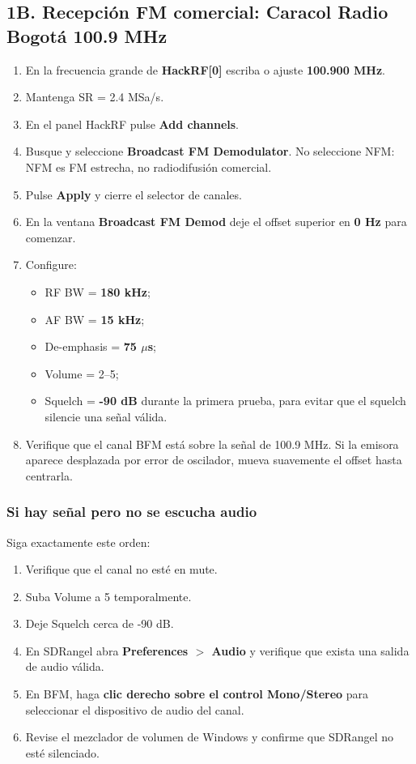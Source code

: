\subsection{1B. Recepción FM comercial: Caracol Radio Bogotá 100.9 MHz}

\begin{enumerate}
    \item En la frecuencia grande de \textbf{HackRF[0]} escriba o ajuste \textbf{100.900 MHz}.
    \item Mantenga SR = 2.4 MSa/s.
    \item En el panel HackRF pulse \textbf{Add channels}.
    \item Busque y seleccione \textbf{Broadcast FM Demodulator}. No seleccione NFM: NFM es FM estrecha, no radiodifusión comercial.
    \item Pulse \textbf{Apply} y cierre el selector de canales.
    \item En la ventana \textbf{Broadcast FM Demod} deje el offset superior en \textbf{0 Hz} para comenzar.
    \item Configure:
    \begin{itemize}
        \item RF BW = \textbf{180 kHz};
        \item AF BW = \textbf{15 kHz};
        \item De-emphasis = \textbf{75 $\mu$s};
        \item Volume = 2--5;
        \item Squelch = \textbf{-90 dB} durante la primera prueba, para evitar que el squelch silencie una señal válida.
    \end{itemize}
    \item Verifique que el canal BFM está sobre la señal de 100.9 MHz. Si la emisora aparece desplazada por error de oscilador, mueva suavemente el offset hasta centrarla.
\end{enumerate}

\subsubsection{Si hay señal pero no se escucha audio}

Siga exactamente este orden:

\begin{enumerate}
    \item Verifique que el canal no esté en mute.
    \item Suba Volume a 5 temporalmente.
    \item Deje Squelch cerca de -90 dB.
    \item En SDRangel abra \textbf{Preferences $>$ Audio} y verifique que exista una salida de audio válida.
    \item En BFM, haga \textbf{clic derecho sobre el control Mono/Stereo} para seleccionar el dispositivo de audio del canal.
    \item Revise el mezclador de volumen de Windows y confirme que SDRangel no esté silenciado.
\end{enumerate}

